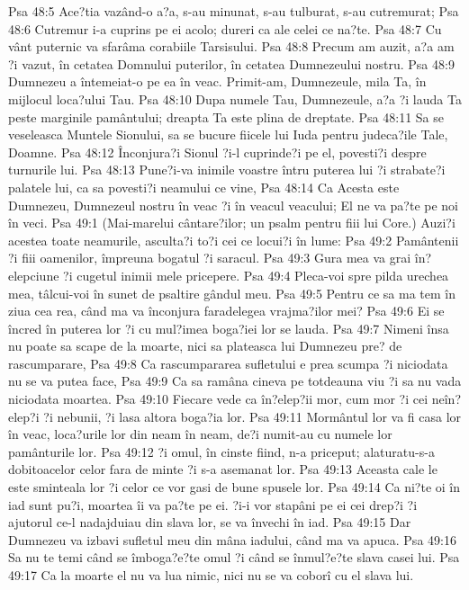 Psa 48:5  Ace?tia vazând-o a?a, s-au minunat, s-au tulburat, s-au cutremurat;
Psa 48:6  Cutremur i-a cuprins pe ei acolo; dureri ca ale celei ce na?te.
Psa 48:7  Cu vânt puternic va sfarâma corabiile Tarsisului.
Psa 48:8  Precum am auzit, a?a am ?i vazut, în cetatea Domnului puterilor, în cetatea Dumnezeului nostru.
Psa 48:9  Dumnezeu a întemeiat-o pe ea în veac. Primit-am, Dumnezeule, mila Ta, în mijlocul loca?ului Tau.
Psa 48:10  Dupa numele Tau, Dumnezeule, a?a ?i lauda Ta peste marginile pamântului; dreapta Ta este plina de dreptate.
Psa 48:11  Sa se veseleasca Muntele Sionului, sa se bucure fiicele lui Iuda pentru judeca?ile Tale, Doamne.
Psa 48:12  Înconjura?i Sionul ?i-l cuprinde?i pe el, povesti?i despre turnurile lui.
Psa 48:13  Pune?i-va inimile voastre întru puterea lui ?i strabate?i palatele lui, ca sa povesti?i neamului ce vine,
Psa 48:14  Ca Acesta este Dumnezeu, Dumnezeul nostru în veac ?i în veacul veacului; El ne va pa?te pe noi în veci.
Psa 49:1  (Mai-marelui cântare?ilor; un psalm pentru fiii lui Core.) Auzi?i acestea toate neamurile, asculta?i to?i cei ce locui?i în lume:
Psa 49:2  Pamântenii ?i fiii oamenilor, împreuna bogatul ?i saracul.
Psa 49:3  Gura mea va grai în?elepciune ?i cugetul inimii mele pricepere.
Psa 49:4  Pleca-voi spre pilda urechea mea, tâlcui-voi în sunet de psaltire gândul meu.
Psa 49:5  Pentru ce sa ma tem în ziua cea rea, când ma va înconjura faradelegea vrajma?ilor mei?
Psa 49:6  Ei se încred în puterea lor ?i cu mul?imea boga?iei lor se lauda.
Psa 49:7  Nimeni însa nu poate sa scape de la moarte, nici sa plateasca lui Dumnezeu pre? de rascumparare,
Psa 49:8  Ca rascumpararea sufletului e prea scumpa ?i niciodata nu se va putea face,
Psa 49:9  Ca sa ramâna cineva pe totdeauna viu ?i sa nu vada niciodata moartea.
Psa 49:10  Fiecare vede ca în?elep?ii mor, cum mor ?i cei neîn?elep?i ?i nebunii, ?i lasa altora boga?ia lor.
Psa 49:11  Mormântul lor va fi casa lor în veac, loca?urile lor din neam în neam, de?i numit-au cu numele lor pamânturile lor.
Psa 49:12  ?i omul, în cinste fiind, n-a priceput; alaturatu-s-a dobitoacelor celor fara de minte ?i s-a asemanat lor.
Psa 49:13  Aceasta cale le este sminteala lor ?i celor ce vor gasi de bune spusele lor.
Psa 49:14  Ca ni?te oi în iad sunt pu?i, moartea îi va pa?te pe ei. ?i-i vor stapâni pe ei cei drep?i ?i ajutorul ce-l nadajduiau din slava lor, se va învechi în iad.
Psa 49:15  Dar Dumnezeu va izbavi sufletul meu din mâna iadului, când ma va apuca.
Psa 49:16  Sa nu te temi când se îmboga?e?te omul ?i când se înmul?e?te slava casei lui.
Psa 49:17  Ca la moarte el nu va lua nimic, nici nu se va coborî cu el slava lui.

